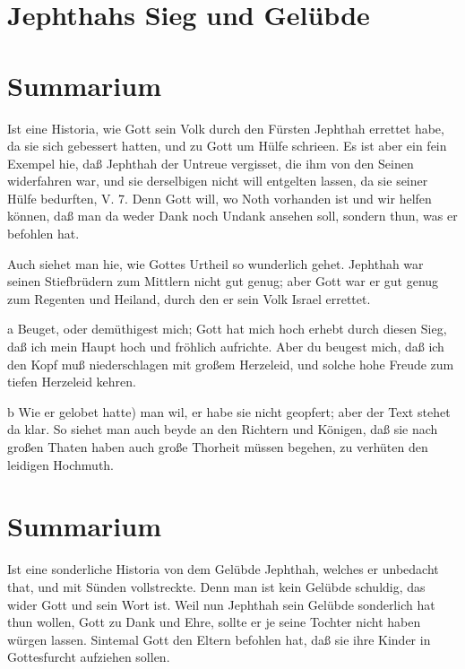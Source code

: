\section{Jephthahs Sieg und Gelübde}
\section{Summarium}

Ist eine Historia, wie Gott sein Volk durch den Fürsten Jephthah errettet habe, da sie sich gebessert hatten, und zu Gott um Hülfe schrieen. Es ist aber ein fein Exempel hie, daß Jephthah der Untreue vergisset, die ihm von den Seinen widerfahren war, und sie derselbigen nicht will entgelten lassen, da sie seiner Hülfe bedurften, V. 7. Denn Gott will, wo Noth vorhanden ist und wir helfen können, daß man da weder Dank noch Undank ansehen soll, sondern thun, was er befohlen hat.

Auch siehet man hie, wie Gottes Urtheil so wunderlich gehet. Jephthah war seinen Stiefbrüdern zum Mittlern nicht gut genug; aber Gott war er gut genug zum Regenten und Heiland, durch den er sein Volk Israel errettet.

a Beuget, oder demüthigest mich; Gott hat mich hoch erhebt durch diesen Sieg, daß ich mein Haupt hoch und fröhlich aufrichte. Aber du beugest mich, daß ich den Kopf muß niederschlagen mit großem Herzeleid, und solche hohe Freude zum tiefen Herzeleid kehren.

b Wie er gelobet hatte) man wil, er habe sie nicht geopfert; aber der Text stehet da klar. So siehet man auch beyde an den Richtern und Königen, daß sie nach großen Thaten haben auch große Thorheit müssen begehen, zu verhüten den leidigen Hochmuth.

\section{Summarium}

Ist eine sonderliche Historia von dem Gelübde Jephthah, welches er unbedacht that, und mit Sünden vollstreckte. Denn man ist kein Gelübde schuldig, das wider Gott und sein Wort ist. Weil nun Jephthah sein Gelübde sonderlich hat thun wollen, Gott zu Dank und Ehre, sollte er je seine Tochter nicht haben würgen lassen. Sintemal Gott den Eltern befohlen hat, daß sie ihre Kinder in Gottesfurcht aufziehen sollen.

